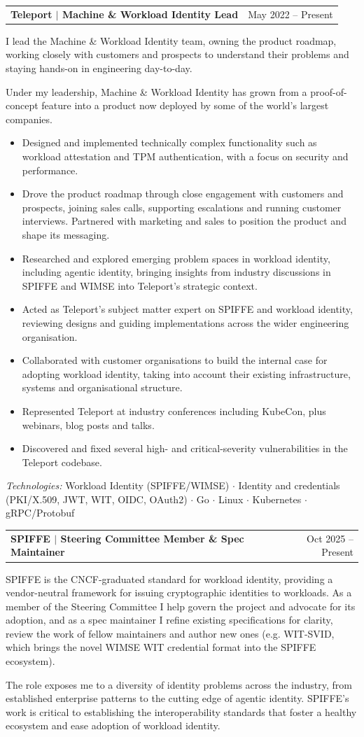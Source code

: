 \documentclass[letterpaper,11pt]{article}
\makeatletter
\newcommand{\resumeItem}[1]{
  \item\small{
    {#1 \vspace{-2pt}}
  }
}
\newcommand{\resumeSubheading}[2]{
  \vspace{-2pt}\item
    \begin{tabular*}{0.97\textwidth}[t]{l@{\extracolsep{\fill}}r}
      \textbf{#1} & #2 \\
    \end{tabular*}\vspace{-7pt}
}
\newcommand{\resumeProse}[1]{\item\small{#1}\vspace{-4pt}}
\newcommand{\resumeItemListStart}{\begin{itemize}}
\newcommand{\resumeItemListEnd}{\end{itemize}\vspace{-5pt}}
\makeatother
\begin{document}
    \filbreak
    \resumeSubheading
      {Teleport $|$ Machine \& Workload Identity Lead}{May 2022 -- Present}
      \resumeProse{I lead the Machine \& Workload Identity team, owning the product roadmap, working closely with customers and prospects to understand their problems and staying hands-on in engineering day-to-day.

\vspace{4pt}
\noindent Under my leadership, Machine \& Workload Identity has grown from a proof-of-concept feature into a product now deployed by some of the world's largest companies.}
      \resumeItemListStart
        \resumeItem{Designed and implemented technically complex functionality such as workload attestation and TPM authentication, with a focus on security and performance.}
        \resumeItem{Drove the product roadmap through close engagement with customers and prospects, joining sales calls, supporting escalations and running customer interviews. Partnered with marketing and sales to position the product and shape its messaging.}
        \resumeItem{Researched and explored emerging problem spaces in workload identity, including agentic identity, bringing insights from industry discussions in SPIFFE and WIMSE into Teleport's strategic context.}
        \resumeItem{Acted as Teleport's subject matter expert on SPIFFE and workload identity, reviewing designs and guiding implementations across the wider engineering organisation.}
        \resumeItem{Collaborated with customer organisations to build the internal case for adopting workload identity, taking into account their existing infrastructure, systems and organisational structure.}
        \resumeItem{Represented Teleport at industry conferences including KubeCon, plus webinars, blog posts and talks.}
        \resumeItem{Discovered and fixed several high- and critical-severity vulnerabilities in the Teleport codebase.}
      \resumeItemListEnd
      \resumeProse{\textit{Technologies: }Workload Identity (SPIFFE/WIMSE) $\cdot$ Identity and credentials (PKI/X.509, JWT, WIT, OIDC, OAuth2) $\cdot$ Go $\cdot$ Linux $\cdot$ Kubernetes $\cdot$ gRPC/Protobuf}

    \filbreak
    \resumeSubheading
      {SPIFFE $|$ Steering Committee Member \& Spec Maintainer}{Oct 2025 -- Present}
      \resumeProse{SPIFFE is the CNCF-graduated standard for workload identity, providing a vendor-neutral framework for issuing cryptographic identities to workloads. As a member of the Steering Committee I help govern the project and advocate for its adoption, and as a spec maintainer I refine existing specifications for clarity, review the work of fellow maintainers and author new ones (e.g. WIT-SVID, which brings the novel WIMSE WIT credential format into the SPIFFE ecosystem).

\vspace{4pt}
\noindent The role exposes me to a diversity of identity problems across the industry, from established enterprise patterns to the cutting edge of agentic identity. SPIFFE's work is critical to establishing the interoperability standards that foster a healthy ecosystem and ease adoption of workload identity.}
\end{document}
